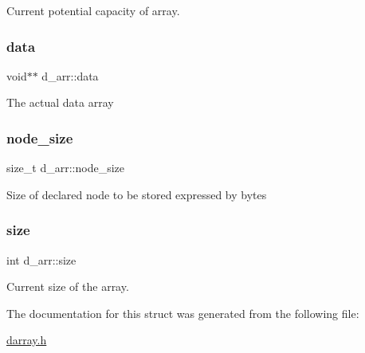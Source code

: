 Current potential capacity of array. \mbox{\label{structd__arr_adbb6770d58b27c30de20b1aa197727af}} 
\subsubsection{\texorpdfstring{data}{data}}
{\footnotesize\ttfamily void$\ast$$\ast$ d\+\_\+arr\+::data}

The actual data array \mbox{\label{structd__arr_a01aabd30c87fd56ce6c027324067ef0c}} 
\subsubsection{\texorpdfstring{node\+\_\+size}{node\_size}}
{\footnotesize\ttfamily size\+\_\+t d\+\_\+arr\+::node\+\_\+size}

Size of declared node to be stored expressed by bytes \mbox{\label{structd__arr_ac5e655e0679e8b2ea60e0dc390d59ba3}} 
\subsubsection{\texorpdfstring{size}{size}}
{\footnotesize\ttfamily int d\+\_\+arr\+::size}

Current size of the array. 

The documentation for this struct was generated from the following file\+:\begin{DoxyCompactItemize}
\item 
\hyperlink{darray_8h}{darray.\+h}\end{DoxyCompactItemize}

